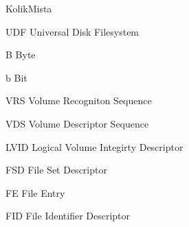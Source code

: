 \begin{seznamzkratek}{KolikMista}

        {UDF}
        {Universal Disk Filesystem}

        {B}
        {Byte}

        {b}
        {Bit}

        {VRS}
        {Volume Recogniton Sequence}
    
        {VDS}
        {Volume Descriptor Sequence}
    
        {LVID}
        {Logical Volume Integirty Descriptor}
    
        {FSD}
        {File Set Descriptor}
    
        {FE}
        {File Entry}
    
        {FID}
        {File Identifier Descriptor}
\end{seznamzkratek}
